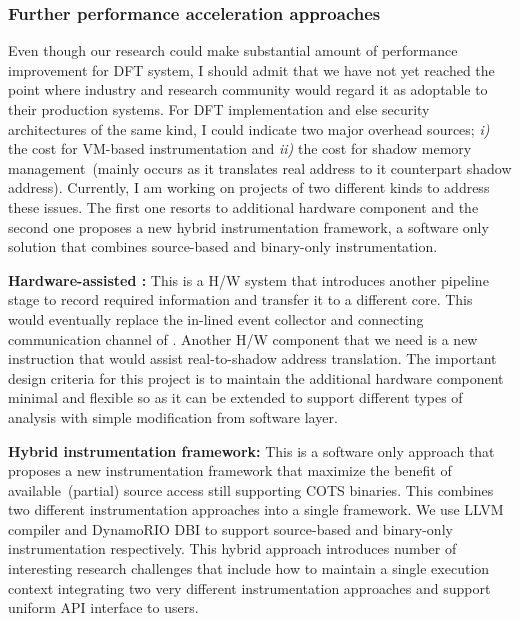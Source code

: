 \documentclass[letterpaper, 10pt]{article}
\begin{document}
\begin{small}
\subsubsection*{Further performance acceleration approaches}
%
Even though our research could make substantial amount of performance
improvement for DFT system, I should admit that we have not yet reached the
point where industry and research community would regard it as adoptable to
their production systems.
%
For DFT implementation and else security architectures of the same kind, I
could indicate two major overhead sources; {\it i)} the cost for VM-based
instrumentation and {\it ii)} the cost for shadow memory management~(mainly
occurs as it translates real address to it counterpart shadow address).
%
Currently, I am working on projects of two different kinds to address these
issues. The first one resorts to additional hardware component and the second
one proposes a new hybrid instrumentation framework, a software only solution
that combines source-based and binary-only instrumentation.

{\bf Hardware-assisted \SR:} 
%
%
This is a H/W system that introduces another pipeline stage to record required
information and transfer it to a different core. This would eventually replace
the in-lined event collector and connecting communication channel of \SR.
Another H/W component that we need is a new instruction that would assist
real-to-shadow address translation. The important design criteria for this
project is to maintain the additional hardware component minimal and flexible
so as it can be extended to support different types of analysis with simple
modification from software layer.
 
{\bf Hybrid instrumentation framework:} This is a software only approach that
proposes a new instrumentation framework that maximize the benefit of
available~(partial) source access still supporting COTS binaries.
%
This combines two different instrumentation approaches into a single framework.
We use LLVM compiler and DynamoRIO DBI to support source-based and binary-only
instrumentation respectively.
%
This hybrid approach introduces number of interesting research challenges that
include how to maintain a single execution context integrating two very different
instrumentation approaches and support uniform API interface to users. 


\end{small}
\end{document}

